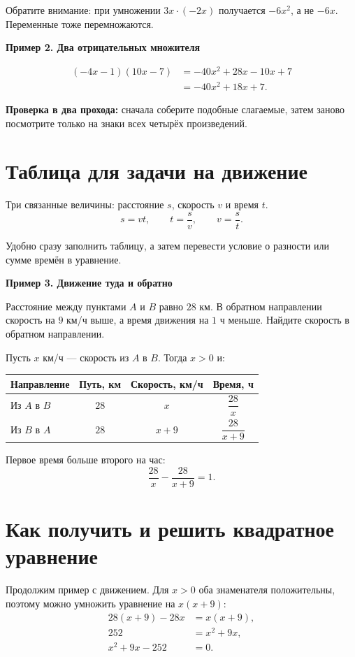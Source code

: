 \documentclass[a4paper,12pt]{article}
\newcommand{\method}[1]{\par\medskip\textcolor{darkaccent}{\textbf{#1}}\par\smallskip}
\newcommand{\important}[1]{\textcolor{darkaccent}{#1}}
\begin{document}
Обратите внимание: при умножении $3x\cdot(-2x)$ получается $-6x^2$, а не $-6x$. Переменные тоже перемножаются.

\method{Пример 2. Два отрицательных множителя}
\begin{align*}
(-4x-1)(10x-7)
 &=-40x^2+28x-10x+7\\
 &=-40x^2+18x+7.
\end{align*}

\textbf{Проверка в два прохода:} сначала соберите подобные слагаемые, затем заново посмотрите только на знаки всех четырёх произведений.

\section{Таблица для задачи на движение}

Три связанные величины: \important{расстояние $s$}, \important{скорость $v$} и \important{время $t$}.
\[
 s=vt,\qquad t=\frac{s}{v},\qquad v=\frac{s}{t}.
\]

Удобно сразу заполнить таблицу, а затем перевести условие о разности или сумме времён в уравнение.

\method{Пример 3. Движение туда и обратно}

Расстояние между пунктами $A$ и $B$ равно $28$ км. В обратном направлении скорость на $9$ км/ч выше, а время движения на $1$ ч меньше. Найдите скорость в обратном направлении.

Пусть $x$ км/ч --- скорость из $A$ в $B$. Тогда $x>0$ и:
\begin{center}
\renewcommand{\arraystretch}{1.28}
\begin{tabular}{@{}lccc@{}}
\toprule
Направление & Путь, км & Скорость, км/ч & Время, ч\\
\midrule
Из $A$ в $B$ & $28$ & $x$ & $\dfrac{28}{x}$\\
Из $B$ в $A$ & $28$ & $x+9$ & $\dfrac{28}{x+9}$\\
\bottomrule
\end{tabular}
\end{center}

Первое время больше второго на час:
\[
\frac{28}{x}-\frac{28}{x+9}=1.
\]

\section{Как получить и решить квадратное уравнение}

Продолжим пример с движением. Для $x>0$ оба знаменателя положительны, поэтому можно умножить уравнение на $x(x+9)$:
\begin{align*}
28(x+9)-28x&=x(x+9),\\
252&=x^2+9x,\\
x^2+9x-252&=0.
\end{align*}
\end{document}
